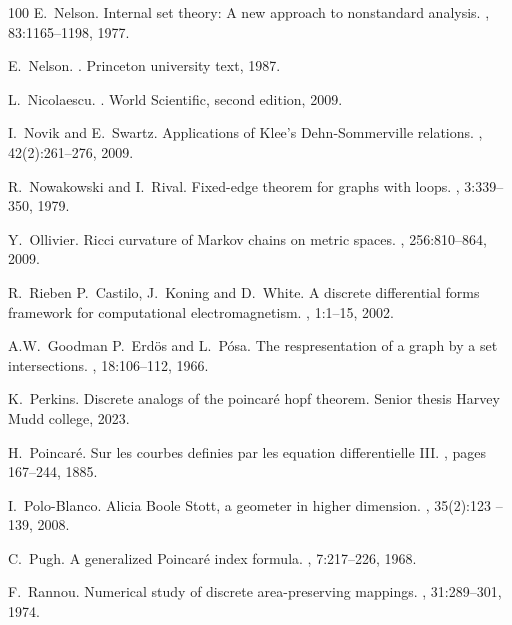 \documentclass[12pt]{amsart}
\begin{document}
\begin{thebibliography}{100}
E.~Nelson.
\newblock Internal set theory: A new approach to nonstandard analysis.
, 83:1165--1198, 1977.

E.~Nelson.
.
\newblock Princeton university text, 1987.

L.~Nicolaescu.
.
\newblock World Scientific, second edition, 2009.

I.~Novik and E.~Swartz.
\newblock Applications of {K}lee's {D}ehn-{S}ommerville relations.
, 42(2):261--276, 2009.

R.~Nowakowski and I.~Rival.
\newblock Fixed-edge theorem for graphs with loops.
, 3:339--350, 1979.

Y.~Ollivier.
\newblock Ricci curvature of {Markov} chains on metric spaces.
, 256:810--864, 2009.

R.~Rieben P.~Castilo, J.~Koning and D.~White.
\newblock A discrete differential forms framework for computational
  electromagnetism.
, 1:1--15, 2002.

A.W.~Goodman P.~Erd\"os and L.~P\'osa.
\newblock The respresentation of a graph by a set intersections.
, 18:106--112, 1966.

K.~Perkins.
\newblock Discrete analogs of the poincar\'e hopf theorem.
\newblock Senior thesis Harvey Mudd college, 2023.

H.~{Poincar\'e}.
\newblock Sur les courbes definies par les equation differentielle {III}.
, pages 167--244,
  1885.

I.~Polo-Blanco.
\newblock Alicia {B}oole {S}tott, a geometer in higher dimension.
, 35(2):123 -- 139, 2008.

C.~Pugh.
\newblock A generalized {P}oincar\'e index formula.
, 7:217--226, 1968.

F.~Rannou.
\newblock Numerical study of discrete area-preserving mappings.
, 31:289--301, 1974.


\end{thebibliography}
\end{document}
